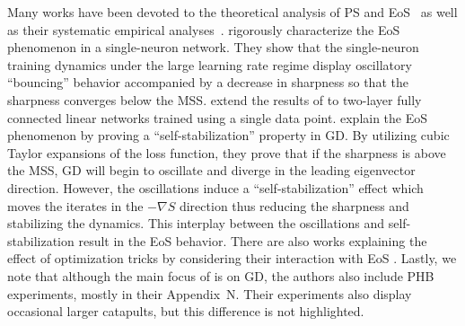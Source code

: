 Many works have been devoted to the theoretical analysis of PS and EoS~\citep{ahn2022stability,zhu2023minimalist,ahn2022threshold,wang2022stability,arora2022stability,damian2023stabilization,song2023bifurcation,wu2023logistic,wu2024logistic} as well as their systematic empirical analyses~\citep{gilmer2022stability,cohen2021stability,cohen2022stability}. \citet{ahn2022threshold} rigorously characterize the EoS phenomenon in a single-neuron network. They show that the single-neuron training dynamics under the large learning rate regime display oscillatory ``bouncing'' behavior accompanied by a decrease in sharpness so that the sharpness converges below the MSS. \citet{song2023bifurcation} extend the results of \citet{ahn2022threshold} to two-layer fully connected linear networks trained using a single data point. \citet{damian2023stabilization} explain the EoS phenomenon by proving a ``self-stabilization'' property in GD. By utilizing cubic Taylor expansions of the loss function, they prove that if the sharpness is above the MSS, GD will begin to oscillate and diverge in the leading eigenvector direction. However, the oscillations induce a ``self-stabilization'' effect which moves the iterates in the $-\nabla S$ direction thus reducing the sharpness and stabilizing the dynamics. This interplay between the oscillations and self-stabilization result in the EoS behavior.
There are also works explaining the effect of optimization tricks by considering their interaction with EoS \citep{gilmer2022stability,fu2023momentum}.
Lastly, we note that although the main focus of \citet{cohen2021stability} is on GD, the authors also include PHB experiments, mostly in their Appendix~N. Their experiments also display occasional larger catapults, but this difference is not highlighted.%



